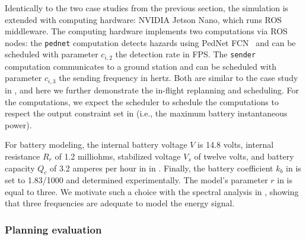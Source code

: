 Identically to the two case studies from the previous section, the simulation is extended with computing hardware: NVIDIA Jetson Nano, which runs ROS middleware. The computing hardware implements two computations via ROS nodes: the {\small\tt pednet} computation detects hazards using PedNet FCN~\citep{ullah2018pednet} and can be scheduled with parameter $c_{i,2}$ the detection rate in FPS. The {\small\tt sender} computation communicates to a ground station and can be scheduled with parameter $c_{i,3}$ the sending frequency in hertz. Both are similar to the case study in , and here we further demonstrate the in-flight replanning and scheduling. For the computations, we expect the scheduler to schedule the computations to respect the output constraint set in  (i.e., the maximum battery instantaneous power).

For battery modeling, the internal battery voltage $V$ is 14.8 volts, internal resistance $R_r$ of 1.2 milliohms, stabilized voltage $V_s$ of twelve volts, and battery capacity $Q_c$ of 3.2 amperes per hour in  in . Finally, the battery coefficient $k_b$ in  is set to 1.83/1000 and determined experimentally. The model's parameter $r$ in  is equal to three. We motivate such a choice with the spectral analysis in , showing that three frequencies are adequate to model the energy signal.

\subsubsection*{Planning evaluation}

